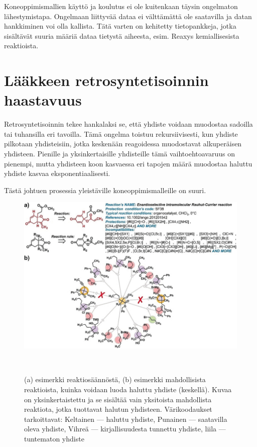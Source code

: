 \documentclass[finnish,twoside,censored,tkt,sw-line]{HYthesisML}
\begin{document}
Koneoppimismallien käyttö ja koulutus ei ole kuitenkaan täysin ongelmaton lähestymistapa.
Ongelmaan liittyvää dataa ei välttämättä ole saatavilla ja datan hankkiminen voi olla kallista.
Tätä varten on kehitetty tietopankkeja, jotka sisältävät suuria määriä dataa tietystä aiheesta, esim. Reaxys kemiallisesista reaktioista.

\section{Lääkkeen retrosyntetisoinnin haastavuus}

Retrosyntetisoinnin tekee hankalaksi se, että yhdiste voidaan muodostaa sadoilla tai tuhansilla eri tavoilla.
Tämä ongelma toistuu rekursiivisesti, kun yhdiste pilkotaan yhdisteisiin, jotka keskenään reagoidessa muodostavat alkuperäisen yhdisteen.
Pienille ja yksinkertaisille yhdisteille tämä vaihtoehtoavaruus on pienempi, mutta yhdisteen koon kasvaessa eri tapojen määrä muodostaa haluttu yhdiste kasvaa eksponentiaalisesti.

Tästä johtuen prosessia yleistäville koneoppimismalleille on suuri.

\begin{figure}
    \centering
    \includegraphics[width=\textwidth]{retrosynthesis.jpg}
    \caption{(a) esimerkki reaktiosäännöstä, (b) esimerkki mahdollisista reaktioista, kuinka voidaan luoda haluttu yhdiste (keskellä).
        Kuvaa on yksinkertaistettu ja se sisältää vain yksitoista mahdollista reaktiota, jotka tuottavat halutun yhdisteen.
        Värikoodaukset tarkoittavat: Keltainen --- haluttu yhdiste, Punainen --- saatavilla oleva yhdiste, Vihreä --- kirjallisuudesta tunnettu yhdiste, liila --- tuntematon yhdiste}
    {~\cite{ExpertKnowledgeRetorsynthesis}}
\end{figure}
\end{document}
